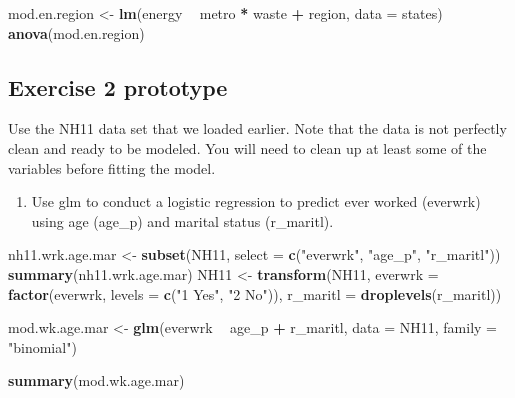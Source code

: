 \documentclass[]{book}
\newenvironment{Shaded}{\begin{snugshade}}{\end{snugshade}}
\newcommand{\KeywordTok}[1]{\textcolor[rgb]{0.13,0.29,0.53}{\textbf{#1}}}
\newcommand{\DataTypeTok}[1]{\textcolor[rgb]{0.13,0.29,0.53}{#1}}
\newcommand{\StringTok}[1]{\textcolor[rgb]{0.31,0.60,0.02}{#1}}
\newcommand{\OperatorTok}[1]{\textcolor[rgb]{0.81,0.36,0.00}{\textbf{#1}}}
\newcommand{\NormalTok}[1]{#1}
\providecommand{\tightlist}{%
  \setlength{\itemsep}{0pt}\setlength{\parskip}{0pt}}
\begin{document}
\begin{Shaded}
\begin{Highlighting}[]
\NormalTok{  mod.en.region <-}\StringTok{ }\KeywordTok{lm}\NormalTok{(energy }\OperatorTok{~}\StringTok{ }\NormalTok{metro }\OperatorTok{*}\StringTok{ }\NormalTok{waste }\OperatorTok{+}\StringTok{ }\NormalTok{region, }\DataTypeTok{data =}\NormalTok{ states)}
  \KeywordTok{anova}\NormalTok{(mod.en.region)}
\end{Highlighting}
\end{Shaded}

\subsection{Exercise 2 prototype}\label{exercise-2-prototype}

Use the NH11 data set that we loaded earlier. Note that the data is not
perfectly clean and ready to be modeled. You will need to clean up at
least some of the variables before fitting the model.

\begin{enumerate}
\def\labelenumi{\arabic{enumi}.}
\tightlist
\item
  Use glm to conduct a logistic regression to predict ever worked
  (everwrk) using age (age\_p) and marital status (r\_maritl).
\end{enumerate}

\begin{Shaded}
\begin{Highlighting}[]
\NormalTok{  nh11.wrk.age.mar <-}\StringTok{ }\KeywordTok{subset}\NormalTok{(NH11, }\DataTypeTok{select =} \KeywordTok{c}\NormalTok{(}\StringTok{"everwrk"}\NormalTok{, }\StringTok{"age_p"}\NormalTok{, }\StringTok{"r_maritl"}\NormalTok{))}
  \KeywordTok{summary}\NormalTok{(nh11.wrk.age.mar)}
\NormalTok{  NH11 <-}\StringTok{ }\KeywordTok{transform}\NormalTok{(NH11,}
                    \DataTypeTok{everwrk =} \KeywordTok{factor}\NormalTok{(everwrk,}
                        \DataTypeTok{levels =} \KeywordTok{c}\NormalTok{(}\StringTok{"1 Yes"}\NormalTok{, }\StringTok{"2 No"}\NormalTok{)),}
                    \DataTypeTok{r_maritl =} \KeywordTok{droplevels}\NormalTok{(r_maritl))}

\NormalTok{  mod.wk.age.mar <-}\StringTok{ }\KeywordTok{glm}\NormalTok{(everwrk }\OperatorTok{~}\StringTok{ }\NormalTok{age_p }\OperatorTok{+}\StringTok{ }\NormalTok{r_maritl, }\DataTypeTok{data =}\NormalTok{ NH11,}
                        \DataTypeTok{family =} \StringTok{"binomial"}\NormalTok{)}

  \KeywordTok{summary}\NormalTok{(mod.wk.age.mar)}
\end{Highlighting}
\end{Shaded}
\end{document}
